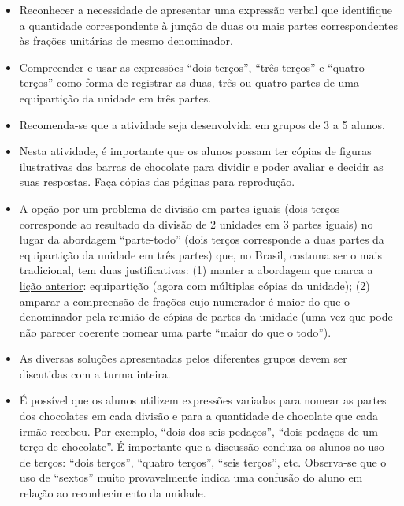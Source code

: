 \begin{atividade}\label{chap2-ativ2}
\objetivos
\begin{itemize} %
\item Reconhecer a necessidade de apresentar uma expressão verbal que identifique a quantidade correspondente à junção de duas ou mais partes correspondentes às frações unitárias de mesmo denominador.

\item Compreender e usar as expressões ``dois terços'', ``três terços'' e ``quatro terços'' como forma de registrar as duas, três ou quatro partes de uma equipartição da unidade em três partes.
\end{itemize} %

\discussoes
\begin{itemize} %
   \item Recomenda-se que a atividade seja desenvolvida em grupos de 3 a 5 alunos.
   \item Nesta atividade, é importante que os alunos possam ter cópias de figuras ilustrativas das barras de chocolate para dividir e poder avaliar e decidir as suas respostas. Faça cópias das páginas para reprodução.
   \item A opção por um problema de divisão em partes iguais (dois terços corresponde ao resultado da divisão de 2 unidades em 3 partes iguais) no lugar da abordagem ``parte-todo'' (dois terços corresponde a duas partes da equipartição da unidade em três partes) que, no Brasil, costuma ser o mais tradicional, tem duas justificativas: (1) manter a abordagem que marca a \hyperref[chap1]{lição anterior}: equipartição (agora com múltiplas cópias da unidade); (2) amparar a compreensão de frações cujo numerador é maior do que o denominador pela reunião de cópias de partes da unidade (uma vez que pode não parecer coerente nomear uma parte ``maior do que o todo'').
   \item As diversas soluções apresentadas pelos diferentes grupos devem ser discutidas com a turma inteira.
   \item É possível que os alunos utilizem expressões variadas para nomear as partes dos chocolates em cada divisão e para a quantidade de chocolate que cada irmão recebeu. Por exemplo, ``dois dos seis pedaços'', ``dois pedaços de um terço de chocolate''. É importante que a discussão conduza os alunos ao uso de terços:       ``dois terços'', ``quatro terços'', ``seis terços'', etc. Observa-se que o uso de ``sextos'' muito provavelmente indica uma confusão do aluno em relação ao reconhecimento da unidade.
  

\end{itemize}
\end{atividade}
